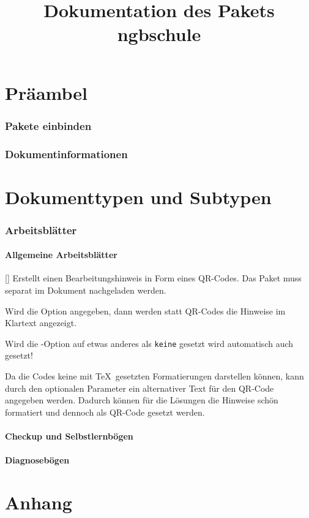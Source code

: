 \documentclass[a4paper,add-index,ngerman]{cnltx-doc}
\title{Dokumentation des Pakets ngbschule}
\begin{document}


\part{Präambel}
\section{Pakete einbinden}
\section{Dokumentinformationen}



\part{Dokumenttypen und Subtypen}
\section{Arbeitsblätter}
\subsection{Allgemeine Arbeitsblätter}
\begin{commands}
	[]
	Erstellt einen Bearbeitungshinweis in Form eines QR-Codes. Das Paket  muss separat im Dokument nachgeladen werden.
	
	Wird die Option  angegeben, dann werden statt QR-Codes die Hinweise im Klartext angezeigt.
	
	Wird die -Option  auf etwas anderes als \texttt{keine} gesetzt wird automatisch auch  gesetzt!
	
	Da die Codes keine mit \TeX\ gesetzten Formatierungen darstellen können, kann durch den optionalen Parameter  ein alternativer Text für den QR-Code angegeben werden. Dadurch können für die Lösungen die Hinweise schön formatiert und dennoch als QR-Code gesetzt werden.
\end{commands}

\subsection{Checkup und Selbstlernbögen}
\subsection{Diagnosebögen}





\part{Anhang}
\end{document}

